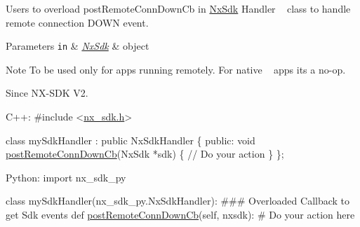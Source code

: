 Users to overload post\+Remote\+Conn\+Down\+Cb in \mbox{\hyperlink{classnxos_1_1_nx_sdk}{Nx\+Sdk}} Handler ~\newline
class to handle remote connection D\+O\+WN event. ~\newline
 
\begin{DoxyParams}[1]{Parameters}
\mbox{\tt in}  & {\em \mbox{\hyperlink{classnxos_1_1_nx_sdk}{Nx\+Sdk}}} & object ~\newline
 \\
\hline
\end{DoxyParams}
\begin{DoxyNote}{Note}
To be used only for apps running remotely. For native ~\newline
 apps its a no-\/op.
\end{DoxyNote}
\begin{DoxySince}{Since}
N\+X-\/\+S\+DK V2. ~\newline
 
\begin{DoxyCode}
C++:                                                        
\textcolor{preprocessor}{   #include <\mbox{\hyperlink{nx__sdk_8h}{nx\_sdk.h}}>}                                          
                                                                
   \textcolor{keyword}{class }mySdkHandler : \textcolor{keyword}{public} NxSdkHandler \{                   
      \textcolor{keyword}{public}:                                                   
         \textcolor{keywordtype}{void} \mbox{\hyperlink{classnxos_1_1_nx_sdk_handler_a433426269ae0b8374f3ead9f06edeb0b}{postRemoteConnDownCb}}(NxSdk *sdk) \{                  
              \textcolor{comment}{// Do your action                                  }
         \}                                                      
   \};                                                            
                                                                 
Python:                                                         
   \textcolor{keyword}{import} nx\_sdk\_py                                             
                                                                     
   \textcolor{keyword}{class }mySdkHandler(nx\_sdk\_py.NxSdkHandler):                       
\textcolor{preprocessor}{   ### Overloaded Callback to get Sdk events                    }
         def \mbox{\hyperlink{classnxos_1_1_nx_sdk_handler_a433426269ae0b8374f3ead9f06edeb0b}{postRemoteConnDownCb}}(self, nxsdk):                       
\textcolor{preprocessor}{             # Do your action here                                         }
\end{DoxyCode}
 
\end{DoxySince}
\mbox{\label{classnxos_1_1_nx_sdk_handler_a71b575abab99f8798635035986dbdc3f}} 
